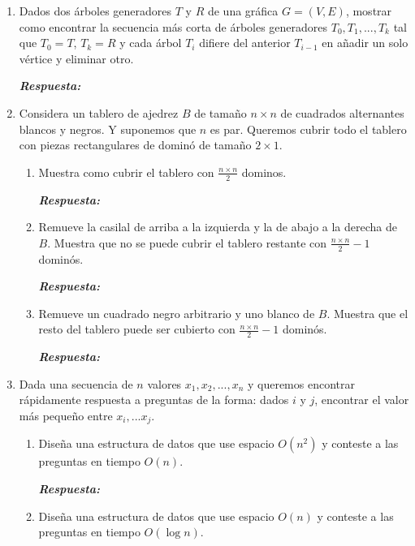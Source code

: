 \documentclass[11pt,letterpaper]{article}
\newcommand\respuesta{\textbf{\textit{Respuesta: }}}
\begin{document}
\begin{enumerate}[leftmargin=*]
    \item Dados dos árboles generadores $T$ y $R$ de una gráfica $G = (V, E)$, mostrar como encontrar la secuencia más corta de árboles generadores $T_0, T_1, ..., T_k$ tal que $T_0 = T$, $T_k = R$ y cada árbol $T_i$ difiere del anterior $T_{i-1}$ en añadir un solo vértice y eliminar otro.
    
    \respuesta

    \item Considera un tablero de ajedrez $B$ de tamaño $n \times n$ de cuadrados alternantes blancos y negros.
    Y suponemos que $n$ es par.
    Queremos cubrir todo el tablero con piezas rectangulares de dominó de tamaño $2 \times 1$.

    \begin{enumerate}[label=\alph*)]
        \item Muestra como cubrir el tablero con $\frac {n \times n} 2$ dominos.
        
        \respuesta

        \item Remueve la casilal de arriba a la izquierda y la de abajo a la derecha de $B$.
        Muestra que no se puede cubrir el tablero restante con $\frac {n \times n} 2 - 1$ dominós.

        \respuesta

        \item Remueve un cuadrado negro arbitrario y uno blanco de $B$.
        Muestra que el resto del tablero puede ser cubierto con $\frac {n \times n} 2 - 1$ dominós.

        \respuesta
    \end{enumerate}

    \item Dada una secuencia de $n$ valores $x_1, x_2, ..., x_n$ y queremos encontrar rápidamente respuesta a preguntas de la forma: dados  $i$ y $j$, encontrar el valor más pequeño entre $x_i, ... x_j$.
    
    \begin{enumerate}[label=\alph*)]
        \item Diseña una estructura de datos que use espacio $O(n^2)$ y conteste a las preguntas en tiempo $O(n)$.
        
        \respuesta

        \item Diseña una estructura de datos que use espacio $O(n)$ y conteste a las preguntas en tiempo $O(\log n)$.
        

\end{enumerate}
\end{enumerate}
\end{document}
